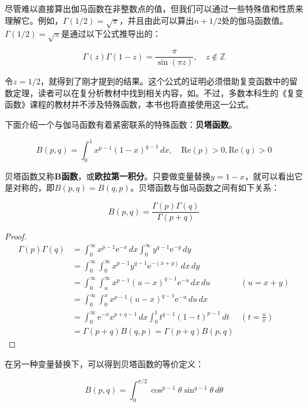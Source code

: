 尽管难以直接算出伽马函数在非整数点的值，但我们可以通过一些特殊值和性质来理解它。例如，$\Gamma(1/2)=\sqrt{\pi}$，并且由此可以算出$n+1/2$处的伽马函数值。$\Gamma(1/2)=\sqrt{\pi}$是通过以下公式推导出的：
\begin{claim}[余元公式]
    \[\Gamma (z)\Gamma (1-z)=\frac{\pi}{\sin(\pi z)},\quad z\notin \mathbb{Z}\]
\end{claim}

令$z=1/2$，就得到了刚才提到的结果。这个公式的证明必须借助复变函数中的留数定理，读者可以在复分析教材中找到相关内容，如\cite{Function_Theory}。不过，多数本科生的《复变函数》课程的教材并不涉及特殊函数，本书也将直接使用这一公式。

下面介绍一个与伽马函数有着紧密联系的特殊函数：\textbf{贝塔函数}。

\begin{definition}[贝塔函数]
    \[B(p,q)=\int_{0}^{1}x^{p-1}(1-x)^{q-1}\,dx,\quad\mathrm{Re}(p)>0,\mathrm{Re}(q)>0\]
\end{definition}
贝塔函数又称\textbf{B函数}，或\textbf{欧拉第一积分}。只要做变量替换$y=1-x$，就可以看出它是对称的，即$B(p,q)=B(q,p)$。贝塔函数与伽马函数之间有如下关系：
\begin{theorem}
    \[B(p,q)=\frac{\Gamma (p)\Gamma (q)}{\Gamma (p+q)}\]
\end{theorem}
\begin{proof}
    \begin{align*}
    \Gamma (p)\Gamma (q)&=\int_{0}^{\infty}x^{p-1}\mathrm{e}^{-x}\,dx\int_{0}^{\infty}y^{q-1}\mathrm{e}^{-y}\,dy\\
    &=\int_{0}^{\infty}\int_{0}^{\infty}x^{p-1}y^{q-1}\mathrm{e}^{-(x+y)}\,dx\,dy\\
    &=\int_{0}^{\infty}\int_{u}^{\infty}x^{p-1}(u-x)^{q-1}\mathrm{e}^{-u}\,dx\,du&(u=x+y)\\
    &=\int_{0}^{\infty}\int_{0}^{x}x^{p-1}(u-x)^{q-1}\mathrm{e}^{-u}\,du\,dx\\
    &=\int_{0}^{\infty}\mathrm{e}^{-x}x^{p+q-1}\,dx\int_{0}^{1}t^{q-1}(1-t)^{p-1}\,dt&\left(t=\frac{u}{x}\right)\\
    &=\Gamma (p+q)B(q,p)=\Gamma (p+q)B(p,q)
    \end{align*}
\end{proof}

在另一种变量替换下，可以得到贝塔函数的等价定义：
\begin{definition}[贝塔函数的等价定义]
    \[B(p,q)=\int_{0}^{\pi/2}\cos^{p-1}\theta\sin^{q-1}\theta\,d\theta\]
\end{definition}


